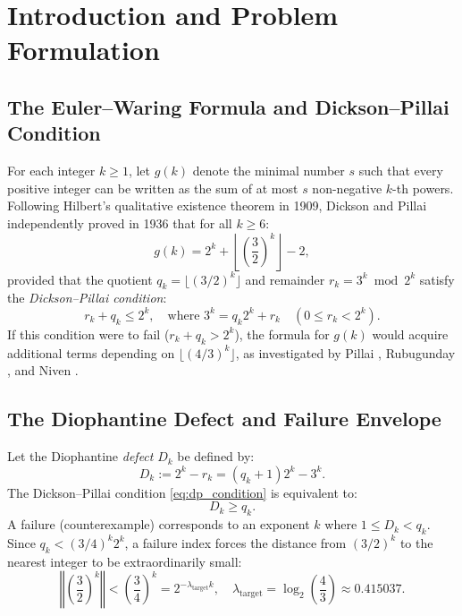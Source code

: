 \documentclass[11pt,reqno]{amsart}
\theoremstyle{definition}
\numberwithin{equation}{section}
\begin{document}
\tableofcontents

\section{Introduction and Problem Formulation}

\subsection{The Euler--Waring Formula and Dickson--Pillai Condition}
For each integer $k \ge 1$, let $g(k)$ denote the minimal number $s$ such that every positive integer can be written as the sum of at most $s$ non-negative $k$-th powers. Following Hilbert's qualitative existence theorem in 1909, Dickson \cite{dickson1936} and Pillai \cite{pillai1936} independently proved in 1936 that for all $k \ge 6$:
\begin{equation}\label{eq:euler_waring}
g(k) = 2^k + \left\lfloor \left(\frac{3}{2}\right)^k \right\rfloor - 2,
\end{equation}
provided that the quotient $q_k = \lfloor (3/2)^k \rfloor$ and remainder $r_k = 3^k \bmod 2^k$ satisfy the \emph{Dickson--Pillai condition}:
\begin{equation}\label{eq:dp_condition}
r_k + q_k \le 2^k, \quad \text{where } 3^k = q_k 2^k + r_k \quad (0 \le r_k < 2^k).
\end{equation}
If this condition were to fail ($r_k + q_k > 2^k$), the formula for $g(k)$ would acquire additional terms depending on $\lfloor (4/3)^k \rfloor$, as investigated by Pillai \cite{pillai1940}, Rubugunday \cite{rubugunday1942}, and Niven \cite{niven1944}.

\subsection{The Diophantine Defect and Failure Envelope}
Let the Diophantine \emph{defect} $D_k$ be defined by:
\begin{equation}\label{eq:defect_def}
D_k := 2^k - r_k = (q_k + 1)2^k - 3^k.
\end{equation}
The Dickson--Pillai condition \eqref{eq:dp_condition} is equivalent to:
\begin{equation}\label{eq:defect_ineq}
D_k \ge q_k.
\end{equation}
A failure (counterexample) corresponds to an exponent $k$ where $1 \le D_k < q_k$.
Since $q_k < (3/4)^k 2^k$, a failure index forces the distance from $(3/2)^k$ to the nearest integer to be extraordinarily small:
\begin{equation}\label{eq:target_exponent}
\left\Vert \left(\frac{3}{2}\right)^k \right\Vert < \left(\frac{3}{4}\right)^k = 2^{-\lambda_{\mathrm{target}} k}, \quad \lambda_{\mathrm{target}} = \log_2\left(\frac{4}{3}\right) \approx 0.415037.
\end{equation}
\end{document}
